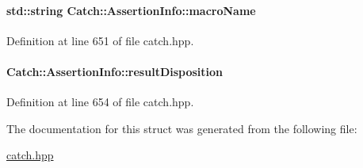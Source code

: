 \paragraph[{macro\+Name}]{\setlength{\rightskip}{0pt plus 5cm}std\+::string Catch\+::\+Assertion\+Info\+::macro\+Name}\label{a00004_ac2e59e8c89e00eb3390768f50d540b18}


Definition at line 651 of file catch.\+hpp.

\hypertarget{a00004_a60353b3632ab2f827162f2b2d6911073}{}
\paragraph[{result\+Disposition}]{ Catch\+::\+Assertion\+Info\+::result\+Disposition}\label{a00004_a60353b3632ab2f827162f2b2d6911073}


Definition at line 654 of file catch.\+hpp.



The documentation for this struct was generated from the following file\+:\begin{DoxyCompactItemize}
\item 
\hyperlink{a00094}{catch.\+hpp}\end{DoxyCompactItemize}
